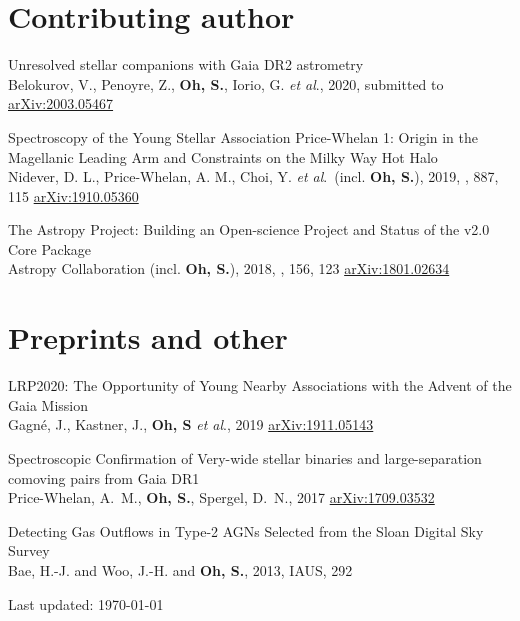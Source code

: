 \documentclass[11pt,letterpaper]{article}
\newcommand*\arxiv[1]{\href{https://arxiv.org/abs/#1}{\small arXiv:#1}}
\newcommand{\etal}{\textit{et al}.}
\newcommand{\pubtitle}[1]{#1}
\newcommand{\inclso}{(incl. {\bf Oh, S.})}
\newcommand{\submitted}[1]{submitted to #1}
\begin{document}
\section*{\small Contributing author}

\begin{etaremune}

  \item \pubtitle{Unresolved stellar companions with Gaia DR2 astrometry}\\
    {Belokurov}, V., {Penoyre}, Z., {\bf {Oh}, S.}, {Iorio}, G. \etal,
    2020, \submitted{\mnras}
    \arxiv{2003.05467}
  
  \item \pubtitle{Spectroscopy of the Young Stellar Association Price-Whelan 1: Origin in the Magellanic Leading Arm and Constraints on the Milky Way Hot Halo}\\
  {Nidever}, D. L., {Price-Whelan}, A. M., {Choi}, Y. \etal\ \inclso,
  2019,
  \apj, 887, 115
  \arxiv{1910.05360}
  
  \item \pubtitle{The Astropy Project: Building an Open-science Project and Status of the v2.0 Core Package}\\
  {Astropy Collaboration} \inclso,
  2018,
  \aj, 156, 123
  \arxiv{1801.02634}

\end{etaremune}

\section*{\small Preprints and other}

\begin{etaremune}
  \item \pubtitle{LRP2020: The Opportunity of Young Nearby Associations with the Advent of the Gaia Mission}\\
  {Gagn{\'e}}, J., {Kastner}, J., {\bf {Oh}, S} \etal,
  2019
  \arxiv{1911.05143}
  

  \item \pubtitle{Spectroscopic Confirmation of Very-wide stellar binaries and
      large-separation comoving pairs from Gaia DR1}\\
    {Price-Whelan}, A.~M., {\bf {Oh}, S.}, {Spergel}, D.~N.,
    2017
    \arxiv{1709.03532}

  \item \pubtitle{Detecting Gas Outflows in Type-2 AGNs Selected from the Sloan Digital Sky Survey}\\
  {{Bae}, H.-J. and {Woo}, J.-H. and {\bf {Oh}, S.}},
  2013,
  IAUS, 292

\end{etaremune}



\bigskip

\begin{center}
  \begin{footnotesize}
    Last updated: \today \\
  \end{footnotesize}
\end{center}
\end{document}

